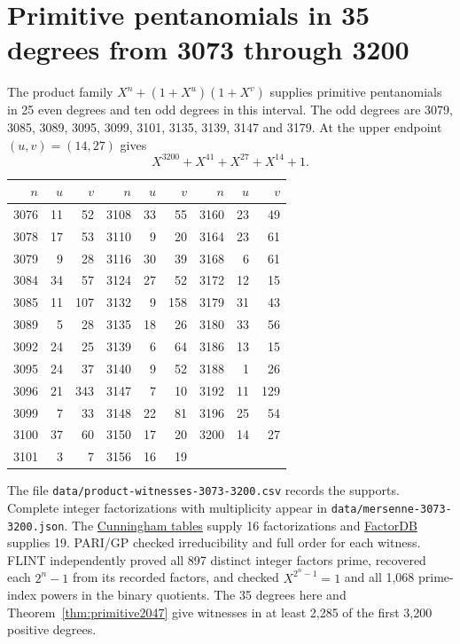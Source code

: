 \documentclass[11pt]{article}
\begin{document}
\section{Primitive pentanomials in 35 degrees from 3073 through 3200}
\label{sec:products-3200}
The product family \(X^n+(1+X^u)(1+X^v)\) supplies primitive
pentanomials in 25 even degrees and ten odd degrees in this interval.
The odd degrees are 3079, 3085, 3089, 3095, 3099, 3101, 3135, 3139, 3147 and 3179.
At the upper endpoint \((u,v)=(14,27)\) gives
\[
                         X^{3200}+X^{41}+X^{27}+X^{14}+1 .
\]
\begin{center}
\begin{tabular}{rrr@{\qquad}rrr@{\qquad}rrr}
\(n\)&\(u\)&\(v\)&\(n\)&\(u\)&\(v\)&\(n\)&\(u\)&\(v\) \\ \hline
3076 & 11 & 52 & 3108 & 33 & 55 & 3160 & 23 & 49 \\
3078 & 17 & 53 & 3110 & 9 & 20 & 3164 & 23 & 61 \\
3079 & 9 & 28 & 3116 & 30 & 39 & 3168 & 6 & 61 \\
3084 & 34 & 57 & 3124 & 27 & 52 & 3172 & 12 & 15 \\
3085 & 11 & 107 & 3132 & 9 & 158 & 3179 & 31 & 43 \\
3089 & 5 & 28 & 3135 & 18 & 26 & 3180 & 33 & 56 \\
3092 & 24 & 25 & 3139 & 6 & 64 & 3186 & 13 & 15 \\
3095 & 24 & 37 & 3140 & 9 & 52 & 3188 & 1 & 26 \\
3096 & 21 & 343 & 3147 & 7 & 10 & 3192 & 11 & 129 \\
3099 & 7 & 33 & 3148 & 22 & 81 & 3196 & 25 & 54 \\
3100 & 37 & 60 & 3150 & 17 & 20 & 3200 & 14 & 27 \\
3101 & 3 & 7 & 3156 & 16 & 19 &  &  &  \\
\end{tabular}
\end{center}
The file \nolinkurl{data/product-witnesses-3073-3200.csv} records the supports.
Complete integer factorizations with multiplicity appear in
\nolinkurl{data/mersenne-3073-3200.json}.
The \href{https://github.com/postvakje/Reformatted-Cunningham-Project-tables/tree/dff2e282ff15399b16b4fb840a410aa2a37076b7}{Cunningham tables}
supply 16 factorizations and
\href{https://factordb.com/index.php?query=2\%5E3200-1}{FactorDB} supplies 19.
PARI/GP checked irreducibility and full order for each witness.
FLINT independently proved all 897 distinct integer factors prime,
recovered each \(2^n-1\) from its recorded factors, and checked
\(X^{2^n-1}=1\) and all 1,068 prime-index powers in the binary
quotients. The 35 degrees here and Theorem~\ref{thm:primitive2047}
give witnesses in at least 2,285 of the first 3,200 positive degrees.
\end{document}
